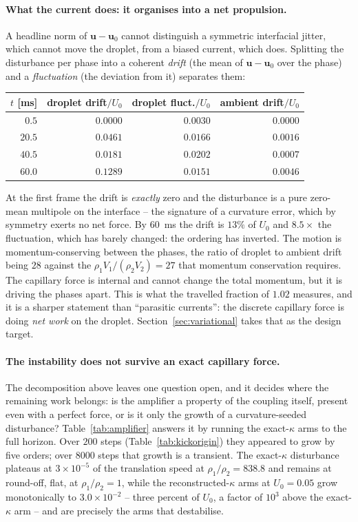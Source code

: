 \documentclass[preprint,3p,11pt]{elsarticle}
\newcommand{\uvec}{\mathbf{u}}
\begin{document}
\paragraph{What the current does: it organises into a net propulsion.} A headline
norm of $\uvec-\uvec_0$ cannot distinguish a symmetric interfacial jitter, which
cannot move the droplet, from a biased current, which does. Splitting the disturbance
per phase into a coherent \emph{drift} (the mean of $\uvec-\uvec_0$ over the phase) and a
\emph{fluctuation} (the deviation from it) separates them:
\begin{center}
  \begin{tabular}{r r r r}
    \hline
    $t$ [ms] & droplet drift$/U_0$ & droplet fluct.$/U_0$ & ambient drift$/U_0$ \\
    \hline
    $0.5$  & $0.0000$ & $0.0030$ & $0.0000$ \\
    $20.5$ & $0.0461$ & $0.0166$ & $0.0016$ \\
    $40.5$ & $0.0181$ & $0.0202$ & $0.0007$ \\
    $60.0$ & $0.1289$ & $0.0151$ & $0.0046$ \\
    \hline
  \end{tabular}
\end{center}
At the first frame the drift is \emph{exactly} zero and the disturbance is a pure
zero-mean multipole on the interface -- the signature of a curvature error, which by
symmetry exerts no net force. By $60$~ms the drift is $13\%$ of $U_0$ and $8.5\times$ the
fluctuation, which has barely changed: the ordering has inverted. The motion is
momentum-conserving between the phases, the ratio of droplet to ambient drift being $28$
against the $\rho_1V_1/(\rho_2V_2)=27$ that momentum conservation requires. The capillary
force is internal and cannot change the total momentum, but it is driving the phases apart.
This is what the travelled fraction of $1.02$ measures, and it is a sharper statement than
``parasitic currents'': the discrete capillary force is doing \emph{net work} on the
droplet. Section~\ref{sec:variational} takes that as the design target.

\paragraph{The instability does not survive an exact capillary force.} The decomposition
above leaves one question open, and it decides where the remaining work belongs: is the
amplifier a property of the coupling itself, present even with a perfect force, or is it
only the growth of a curvature-seeded disturbance? Table~\ref{tab:amplifier} answers it by
running the exact-$\kappa$ arms to the full horizon. Over $200$ steps
(Table~\ref{tab:kickorigin}) they appeared to grow by five orders; over $8000$ steps that
growth is a transient. The exact-$\kappa$ disturbance plateaus at $3\times10^{-5}$ of the
translation speed at $\rho_1/\rho_2=838.8$ and remains at round-off, flat, at
$\rho_1/\rho_2=1$, while the reconstructed-$\kappa$ arms at $U_0=0.05$ grow monotonically to
$3.0\times10^{-2}$ -- three percent of $U_0$, a factor of $10^{3}$ above the exact-$\kappa$
arm -- and are precisely the arms that destabilise.
\end{document}
